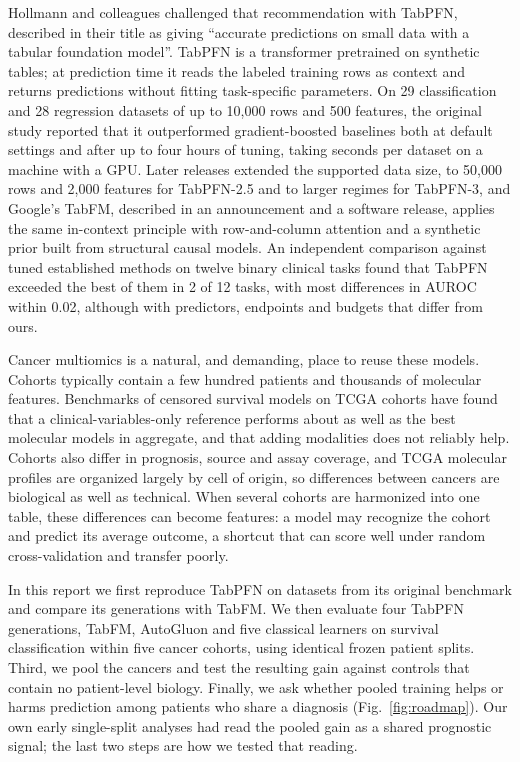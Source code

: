 \documentclass[pdflatex,sn-nature]{sn-jnl}
\begin{document}
Hollmann and colleagues challenged that recommendation with TabPFN, described in their title as giving ``accurate predictions on small data with a tabular foundation model''.\citep{hollmann2025accurate} TabPFN is a transformer pretrained on synthetic tables; at prediction time it reads the labeled training rows as context and returns predictions without fitting task-specific parameters. On 29 classification and 28 regression datasets of up to 10,000 rows and 500 features, the original study reported that it outperformed gradient-boosted baselines both at default settings and after up to four hours of tuning, taking seconds per dataset on a machine with a GPU. Later releases extended the supported data size, to 50,000 rows and 2,000 features for TabPFN-2.5 and to larger regimes for TabPFN-3,\citep{priorlabs2025tabpfn25,priorlabs2026tabpfn3} and Google's TabFM, described in an announcement and a software release, applies the same in-context principle with row-and-column attention and a synthetic prior built from structural causal models.\citep{google2026tabfm,tabfmsoftware2026} An independent comparison against tuned established methods on twelve binary clinical tasks found that TabPFN exceeded the best of them in 2 of 12 tasks, with most differences in AUROC within 0.02, although with predictors, endpoints and budgets that differ from ours.\citep{shaktah2026established}

Cancer multiomics is a natural, and demanding, place to reuse these models. Cohorts typically contain a few hundred patients and thousands of molecular features. Benchmarks of censored survival models on TCGA cohorts have found that a clinical-variables-only reference performs about as well as the best molecular models in aggregate, and that adding modalities does not reliably help.\citep{herrmann2021benchmark,li2024combining,wissel2023systematic} Cohorts also differ in prognosis, source and assay coverage, and TCGA molecular profiles are organized largely by cell of origin,\citep{hoadley2018cell} so differences between cancers are biological as well as technical. When several cohorts are harmonized into one table, these differences can become features: a model may recognize the cohort and predict its average outcome, a shortcut that can score well under random cross-validation and transfer poorly.\citep{soneson2014batch,bernau2014crossstudy,geirhos2020shortcut}

In this report we first reproduce TabPFN on datasets from its original benchmark and compare its generations with TabFM. We then evaluate four TabPFN generations, TabFM, AutoGluon and five classical learners on survival classification within five cancer cohorts, using identical frozen patient splits. Third, we pool the cancers and test the resulting gain against controls that contain no patient-level biology. Finally, we ask whether pooled training helps or harms prediction among patients who share a diagnosis (Fig.~\ref{fig:roadmap}). Our own early single-split analyses had read the pooled gain as a shared prognostic signal; the last two steps are how we tested that reading.
\end{document}
